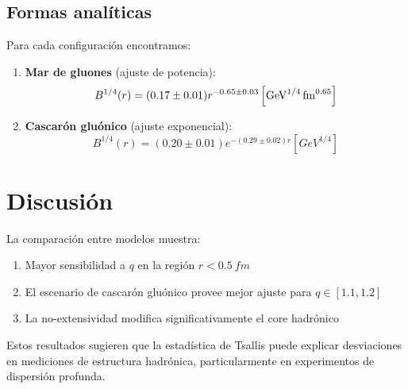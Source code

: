 \subsection{Formas analíticas}
Para cada configuración encontramos:

\begin{enumerate}
    \item \textbf{Mar de gluones} (ajuste de potencia):
    \begin{equation}
    {B}^{1/4}(r) = (0.17 \pm 0.01) {r}^{-0.65 \pm 0.03} \left[\unit[per-mode = fraction]{{GeV}^{1/4}.{fm}^{0.65}}\right] \label{eq-Bsea}
    \end{equation}
    \item \textbf{Cascarón gluónico} (ajuste exponencial):
    \begin{equation}
    {B}^{1/4}(r) = (0.20 \pm 0.01) e^{-(0.29 \pm 0.02)r} \left[\unit{{GeV}^{1/4}}\right] \label{eq-Bshell}
    \end{equation}
\end{enumerate}

\section{Discusión}

La comparación entre modelos muestra:

\begin{enumerate}[ i. ]
    \item Mayor sensibilidad a $q$ en la región $r < \qty{0.5}{fm}$
    \item El escenario de cascarón gluónico provee mejor ajuste para $q \in [1.1,1.2]$
    \item La no-extensividad modifica significativamente el core hadrónico
\end{enumerate}

\begin{remark}
    Estos resultados sugieren que la estadística de Tsallis puede explicar desviaciones en mediciones de estructura hadrónica, particularmente en experimentos de dispersión profunda.
\end{remark}


